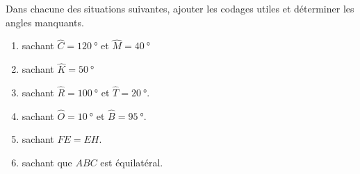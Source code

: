 
\begin{exercice}\label{exo2smath-0070}

    Dans chacune des situations suivantes, ajouter les codages utiles et déterminer les angles manquants.
    \begin{enumerate}
        \item
   sachant
             \( \hat C=\SI{120}{\degree}\) et \( \hat{M}=\SI{40}{\degree}\)
\item
    sachant \( \hat{K}=\SI{50}{\degree}\)
\item
    sachant \( \hat{R}=\SI{100}{\degree}\) et \( \hat{T}=\SI{20}{\degree}\).
\item
\begin{center}
    sachant \( \hat{O}=\SI{10}{\degree}\) et \( \hat{B}=\SI{95}{\degree}\).
\end{center}
\item
\begin{center}
   sachant \( FE=EH\).
\end{center}
\item
\begin{center}
   sachant que \( ABC\) est équilatéral.
\end{center}
            
    \end{enumerate}

\end{exercice}
